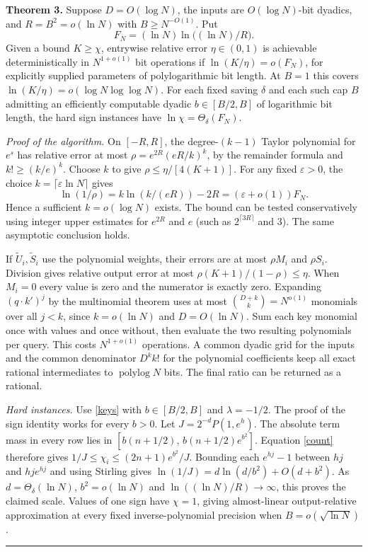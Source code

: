 \documentclass[11pt,letterpaper]{article}
\newcommand{\qedmark}{\unskip\nobreak\hfill\rule{0.5em}{0.5em}}
\newcommand{\result}[1]{\smallskip\textbf{#1}\enspace}
\begin{document}
\result{Theorem 3.} Suppose $D=O(\log N)$, the inputs are $O(\log N)$-bit dyadics, and $R=B^2=o(\ln N)$ with $B\ge N^{-O(1)}$. Put
\[
 F_N=(\ln N)\ln\big((\ln N)/R\big).
\]
Given a bound $K\ge\chi$, entrywise relative error $\eta\in(0,1)$ is achievable deterministically in $N^{1+o(1)}$ bit operations if $\ln(K/\eta)=o(F_N)$, for explicitly supplied parameters of polylogarithmic bit length. At $B=1$ this covers $\ln(K/\eta)=o(\log N\log\log N)$. For each fixed saving $\delta$ and each such cap $B$ admitting an efficiently computable dyadic $b\in[B/2,B]$ of logarithmic bit length, the hard sign instances have $\ln\chi=\Theta_\delta(F_N)$.

\textit{Proof of the algorithm.} On $[-R,R]$, the degree-$(k-1)$ Taylor polynomial for $e^s$ has relative error at most $\rho=e^{2R}(eR/k)^k$, by the remainder formula and $k!\ge(k/e)^k$. Choose $k$ to give $\rho\le\eta/[4(K+1)]$. For any fixed $\varepsilon>0$, the choice $k=\lceil\varepsilon\ln N\rceil$ gives
\[
 \ln(1/\rho)=k\ln(k/(eR))-2R=(\varepsilon+o(1))F_N .
\]
Hence a sufficient $k=o(\log N)$ exists. The bound can be tested conservatively using integer upper estimates for $e^{2R}$ and $e$ (such as $2^{\lceil3R\rceil}$ and $3$). The same asymptotic conclusion holds.

If $\widetilde U_i,\widetilde S_i$ use the polynomial weights, their errors are at most $\rho M_i$ and $\rho S_i$. Division gives relative output error at most $\rho(K+1)/(1-\rho)\le\eta$. When $M_i=0$ every value is zero and the numerator is exactly zero. Expanding $(q\cdot k')^j$ by the multinomial theorem uses at most $\binom{D+k}{k}=N^{o(1)}$ monomials over all $j<k$, since $k=o(\ln N)$ and $D=O(\ln N)$. Sum each key monomial once with values and once without, then evaluate the two resulting polynomials per query. This costs $N^{1+o(1)}$ operations. A common dyadic grid for the inputs and the common denominator $D^k k!$ for the polynomial coefficients keep all exact rational intermediates to $\operatorname{polylog}N$ bits. The final ratio can be returned as a rational.

\textit{Hard instances.} Use \eqref{keys} with $b\in[B/2,B]$ and $\lambda=-1/2$. The proof of the sign identity works for every $b>0$. Let $J=2^{-d}P(1,e^h)$. The absolute term mass in every row lies in $[b(n+1/2),\,b(n+1/2)e^{b^2}]$. Equation \eqref{count} therefore gives $1/J\le\chi_i\le (2n+1)e^{b^2}/J$. Bounding each $e^{hj}-1$ between $hj$ and $hj e^{hj}$ and using Stirling gives $\ln(1/J)=d\ln(d/b^2)+O(d+b^2)$. As $d=\Theta_\delta(\ln N)$, $b^2=o(\ln N)$ and $\ln((\ln N)/R)\to\infty$, this proves the claimed scale. Values of one sign have $\chi=1$, giving almost-linear output-relative approximation at every fixed inverse-polynomial precision when $B=o(\sqrt{\ln N})$. \qedmark
\newpage
\end{document}
